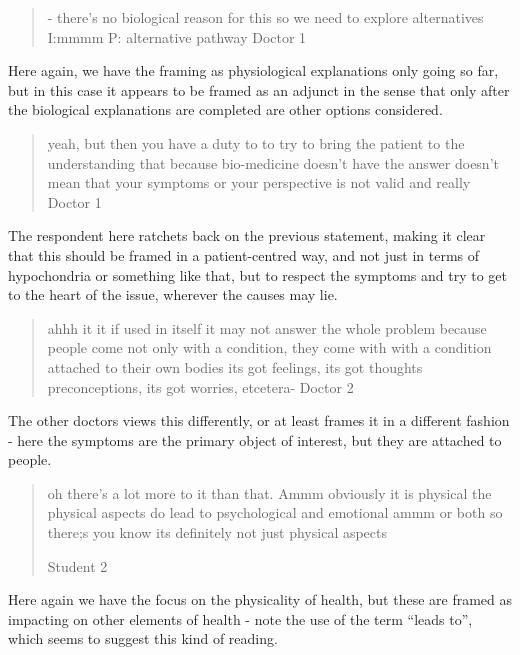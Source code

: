 
\begin{quotation}
  - there's no biological reason for this so we need to explore alternatives 
I:mmmm
P: alternative pathway
Doctor 1
\end{quotation}

Here again, we have the framing as physiological explanations only going so far, but in this case it appears to be framed as an adjunct in the sense that only after the biological explanations are completed are other options considered. 

\begin{quotation}
  yeah, but then you have a duty to to try to bring the patient to the understanding that because bio-medicine doesn't have the answer doesn't mean that your symptoms or your perspective is not valid and really 
Doctor 1
\end{quotation}


The respondent here ratchets back on the previous statement, making it clear that this should be framed in a patient-centred way, and not just in terms of hypochondria or something like that, but to respect the symptoms and try to get to the heart of the issue, wherever the causes may lie. 

\begin{quotation}
  ahhh it it if used in itself it may not answer the whole problem because people come not only with a condition, they come with with a condition attached to their own bodies its got feelings, its got thoughts preconceptions, its got worries, etcetera-
Doctor 2
\end{quotation}


The other doctors views this differently, or at least frames it in a different fashion - here the symptoms are the primary object of interest, but they are attached to people. 

\begin{quotation}
  oh there's a lot more to it than that. Ammm obviously it is physical the physical aspects do lead to psychological and emotional ammm or both so there;s you know its definitely not just physical aspects 

Student 2
\end{quotation}

Here again we have the focus on the physicality of health, but these are framed as impacting on other elements of health - note the use of the term ``leads to'', which seems to suggest this kind of reading. 



